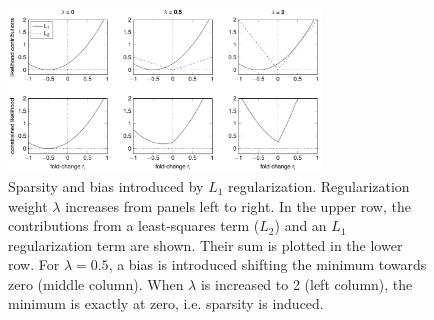 \documentclass{bioinfo}
\begin{document}
\begin{figure}[!tpb]%
\centerline{\includegraphics[width=235pt]{Figures/l1_cartoon_priorstrength.pdf}}
\caption{Sparsity and bias introduced by $L_1$ regularization. Regularization weight $\lambda$ increases from panels left to right. In the upper row, the contributions from a least-squares term ($L_2$) and an $L_1$ regularization term are shown. Their sum is plotted in the lower row. For $\lambda=0.5$, a bias is introduced shifting the minimum towards zero (middle column). When $\lambda$ is increased to 2 (left column), the minimum is exactly at zero, i.e. sparsity is induced.}\label{fig:02}
\end{figure}
\end{document}
